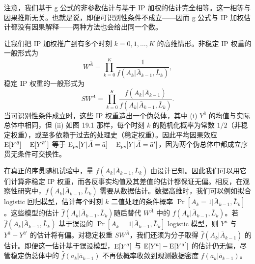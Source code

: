 
注意，我们基于 g 公式的非参数估计与基于 IP 加权的估计完全相等。这一相等与因果推断无关。也就是说，即便可识别性条件不成立——因而 g 公式与 IP 加权估计都没有因果解释——两种方法也会给出同一个数。

让我们把 IP 加权推广到有多个时刻 $k=0,1,\dots,K$ 的高维情形。非稳定 IP 权重的一般形式为
\[
W^{\bar A}=\prod_{k=0}^{K}\frac{1}{f(A_k|\bar A_{k-1},\bar L_k)},
\]
稳定 IP 权重的一般形式为
\[
SW^{\bar A}=\prod_{k=0}^{K}\frac{f(A_k|\bar A_{k-1})}{f(A_k|\bar A_{k-1},\bar L_k)}.
\]
当可识别性条件成立时，这些 IP 权重造出一个伪总体，其中 (i) $Y^{\bar a}$ 的均值与实际总体中相同，但 (ii) 如图 19.1 那样，每个时刻 $k$ 的随机化概率为常数 $1/2$（非稳定权重），或至多依赖于过去的处理史（稳定权重）。因此平均因果效应 $\mathrm{E}[Y^{\bar a}]-\mathrm{E}[Y^{\bar a'}]$ 等于 $\mathrm{E}_{ps}[Y|\bar A=\bar a]-\mathrm{E}_{ps}[Y|\bar A=\bar a']$，因为两个伪总体中都成立序贯无条件可交换性。


在真正的序贯随机试验中，量 $f(A_k|\bar A_{k-1},\bar L_k)$ 由设计已知。因此我们可以用它们计算非稳定 IP 权重，而各反事实均值及其差值的估计都保证无偏。相反，在观察性研究中，$f(A_k|\bar A_{k-1},\bar L_k)$ 需要从数据估计。数据高维时，我们可以例如拟合 logistic 回归模型，估计每个时刻 $k$ 二值处理的条件概率 $\Pr[A_k=1|\bar A_{k-1},\bar L_k]$。这些模型的估计 $\hat f(A_k|\bar A_{k-1},\bar L_k)$\allowbreak 随后替代 $W^{\bar A}$ 中的 $f(A_k|\bar A_{k-1},\bar L_k)$。若 $\hat f(A_k|\bar A_{k-1},\bar L_k)$ 基于误设的 $\Pr[A_k=1|\bar A_{k-1},\bar L_k]$ logistic 模型，则 $Y^{\bar a}$ 与 $Y^{\bar a}-Y^{\bar a'}$ 的估计将有偏。对稳定权重 $SW^{\bar A}$，我们还须为分子取得 $\hat f(A_k|\bar A_{k-1})$ 的估计。即便这一估计基于误设模型，$\mathrm{E}[Y^{\bar a}]$ 与 $\mathrm{E}[Y^{\bar a}]-\mathrm{E}[Y^{\bar a'}]$ 的估计仍无偏，尽管稳定伪总体中的 $\hat f(a_k|\bar a_{k-1})$ 不再依概率收敛到观测数据密度 $f(a_k|\bar a_{k-1})$。



